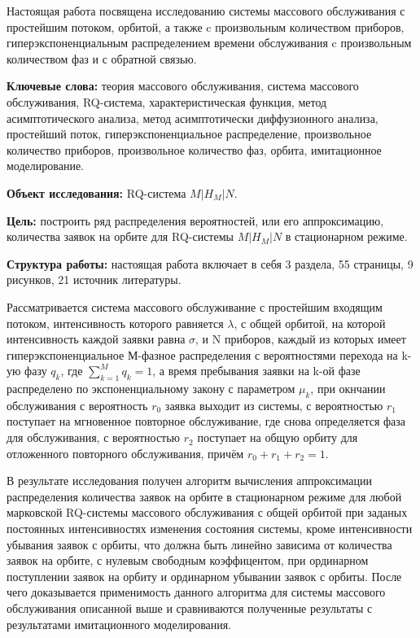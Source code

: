 \hspace*{\parindent}%
Настоящая работа посвящена исследованию системы массового обслуживания с простейшим потоком, орбитой, а также c произвольным количеством приборов, гиперэкспоненциальным распределением времени обслуживания c произвольным количеством фаз и с обратной связью.

\textbf{Ключевые слова:} теория массового обслуживания, система массового обслуживания, RQ-система, характеристическая функция, метод асимптотического анализа, метод асимптотически диффузионного анализа, простейший поток, гиперэкспоненциальное распределение, произвольное количество приборов, произвольное количество фаз, орбита, имитационное моделирование.

\textbf{Объект исследования:} RQ-система $M|H_M|N$.

\textbf{Цель:} построить ряд распределения вероятностей, или его аппроксимацию, количества заявок на орбите для RQ-системы $M|H_M|N$ в стационарном режиме.

\textbf{Структура работы:} настоящая работа включает в себя 3 раздела, 55 страницы, 9 рисунков, 21 источник литературы.

Рассматривается система массового обслуживание с простейшим входящим потоком, интенсивность которого равняется \(\lambda\), с общей орбитой, на которой интенсивность каждой заявки равна \(\sigma\), и N приборов, каждый из которых имеет гиперэкспоненциальное М-фазное распределения с вероятностями перехода на k-ую фазу \(q_k\), где \(\sum_{k=1}^M q_k = 1\), а время пребывания заявки на k-ой фазе распределено по экспоненциальному закону с параметром \(\mu_k\), при окнчании обслуживания с вероятность \(r_0\) заявка выходит из системы, с вероятностью \(r_1\) поступает на мгновенное повторное обслуживание, где снова определяется фаза для обслуживания, с вероятностью \(r_2\) поступает на общую орбиту для отложенного повторного обслуживания, причём \(r_0 + r_1 + r_2 = 1\).

В результате исследования получен алгоритм вычисления аппроксимации распределения количества заявок на орбите в стационарном режиме для любой марковской RQ-системы массового обслуживания с общей орбитой при заданых постоянных интенсивностях изменения состояния системы, кроме интенсивности убывания заявок с орбиты, что должна быть линейно зависима от количества заявок на орбите, с нулевым свободным коэффицентом, при ординарном поступлении заявок на орбиту и ординарном убывании заявок с орбиты. После чего доказывается применимость данного алгоритма для системы массового обслуживания описанной выше и сравниваются полученные результаты с результатами имитационного моделирования.


